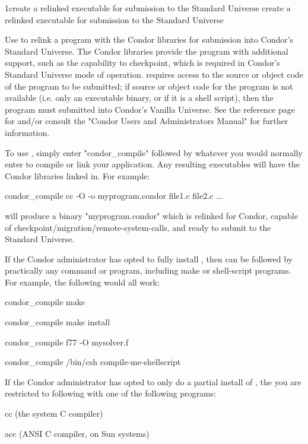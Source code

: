 \begin{ManPage}{}{1}{create a relinked executable for submission to the Standard Universe create a relinked executable for submission to the Standard Universe} 
\label{man-condor-compile}
\Synopsis {}

\Description
Use  to relink a program with the Condor libraries for submission into Condor's Standard Universe. The
Condor libraries provide the program with additional support, such as the capability to checkpoint, which is required in
Condor's Standard Universe mode of operation.  requires access to the source or object code of the
program to be submitted; if source or object code for the program is not available (i.e. only an executable binary, or if it is a
shell script), then the program must submitted into Condor's Vanilla Universe. See the reference page for 
and/or consult the "Condor Users and Administrators Manual" for further information. 

To use , simply enter "condor\_compile" followed by whatever you would normally enter to compile or link
your application. Any resulting executables will have the Condor libraries linked in. For example: 

condor\_compile cc -O -o myprogram.condor file1.c file2.c ... 

will produce a binary "myprogram.condor" which is relinked for Condor, capable of
checkpoint/migration/remote-system-calls, and ready to submit to the Standard Universe. 

If the Condor administrator has opted to fully install , then  can be followed by practically any
command or program, including make or shell-script programs. For example, the following would all work: 

condor\_compile make 

condor\_compile make install 

condor\_compile f77 -O mysolver.f 

condor\_compile /bin/csh compile-me-shellscript 

If the Condor administrator has opted to only do a partial install of , the you are restricted to following
 with one of the following programs: 

     cc (the system C compiler) 

     acc (ANSI C compiler, on Sun systems) 


\end{ManPage}
